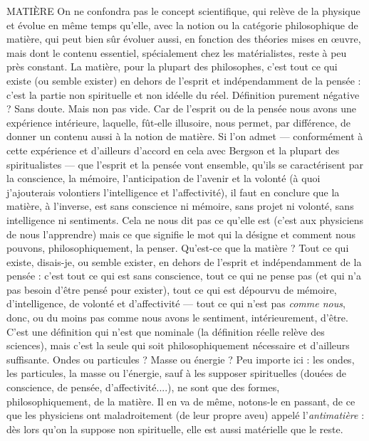 MATIÈRE On ne confondra pas le concept scientifique, qui relève de la
physique et évolue en même temps qu’elle, avec la notion ou la
catégorie philosophique de matière, qui peut bien sûr évoluer aussi, en fonction
des théories mises en œuvre, mais dont le contenu essentiel, spécialement chez
les matérialistes, reste à peu près constant. La matière, pour la plupart des philosophes,
c’est tout ce qui existe (ou semble exister) en dehors de l’esprit et
indépendamment de la pensée : c’est la partie non spirituelle et non idéelle du
réel. Définition purement négative ? Sans doute. Mais non pas vide. Car de
l'esprit ou de la pensée nous avons une expérience intérieure, laquelle, fût-elle
illusoire, nous permet, par différence, de donner un contenu aussi à la notion
de matière. Si l’on admet — conformément à cette expérience et d’ailleurs
d'accord en cela avec Bergson et la plupart des spiritualistes — que l'esprit et la
pensée vont ensemble, qu’ils se caractérisent par la conscience, la mémoire,
l’anticipation de l’avenir et la volonté (à quoi j’ajouterais volontiers l’intelligence
et l’affectivité), il faut en conclure que la matière, à l'inverse, est sans
conscience ni mémoire, sans projet ni volonté, sans intelligence ni sentiments.
Cela ne nous dit pas ce qu’elle est (c’est aux physiciens de nous l’apprendre)
mais ce que signifie le mot qui la désigne et comment nous pouvons, philosophiquement,
la penser. Qu'est-ce que la matière ? Tout ce qui existe, disais-je,
ou semble exister, en dehors de l'esprit et indépendamment de la pensée : c’est
tout ce qui est sans conscience, tout ce qui ne pense pas (et qui n’a pas besoin
d’être pensé pour exister), tout ce qui est dépourvu de mémoire, d’intelligence,
de volonté et d’affectivité — tout ce qui n’est pas {\it comme nous}, donc, ou du
moins pas comme nous avons le sentiment, intérieurement, d’être. C’est une
définition qui n’est que nominale (la définition réelle relève des sciences), mais
c’est la seule qui soit philosophiquement nécessaire et d’ailleurs suffisante.
Ondes ou particules ? Masse ou énergie ? Peu importe ici : les ondes, les particules,
la masse ou l’énergie, sauf à les supposer spirituelles (douées de conscience,
de pensée, d’affectivité....), ne sont que des formes, philosophiquement,
de la matière. Il en va de même, notons-le en passant, de ce que les physiciens
ont maladroitement (de leur propre aveu) appelé l’{\it antimatière} : dès lors qu’on
la suppose non spirituelle, elle est aussi matérielle que le reste.

